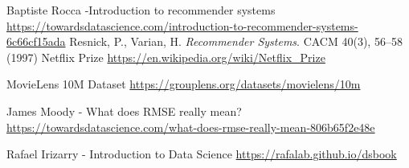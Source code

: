 \documentclass[]{article}
\begin{document}
\begin{thebibliography}{9}
Baptiste Rocca -Introduction to recommender systems \url{https://towardsdatascience.com/introduction-to-recommender-systems-6c66cf15ada}
Resnick, P., Varian, H. \textit{Recommender Systems}. CACM 40(3), 56–58 (1997)
Netflix Prize \url{https://en.wikipedia.org/wiki/Netflix_Prize}

MovieLens 10M Dataset \url{https://grouplens.org/datasets/movielens/10m}

James Moody - What does RMSE really mean? \url{https://towardsdatascience.com/what-does-rmse-really-mean-806b65f2e48e}

Rafael Irizarry - Introduction to Data Science \url{https://rafalab.github.io/dsbook}


\end{thebibliography}
\end{document}
